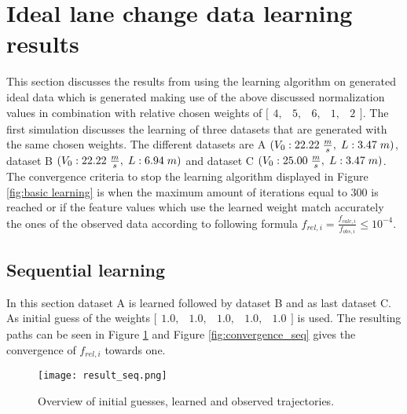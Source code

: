 \section{Ideal lane change data learning results}
This section discusses the results from using the learning algorithm on generated ideal data which is generated making use of the above discussed normalization values in combination with relative chosen weights of $ \bigl[ \begin{smallmatrix} 4,&5,&6,&1,&2\end{smallmatrix}\bigr]$. The first simulation discusses the learning of three datasets that are generated with the same chosen weights. The different datasets are A $(V_0:22.22\hspace{1mm}\frac{m}{s},\hspace{1mm} L:3.47\hspace{1mm}m)$, dataset B $(V_0:22.22\hspace{1mm}\frac{m}{s},\hspace{1mm} L:6.94\hspace{1mm}m)$ and dataset C $(V_0:25.00\hspace{1mm}\frac{m}{s},\hspace{1mm} L:3.47\hspace{1mm}m)$. The convergence criteria to stop the learning algorithm displayed in Figure \ref{fig:basic learning} is when the maximum amount of iterations equal to $300$ is reached or if the feature values which use the learned weight match accurately the ones of the observed data according to following formula $f_{rel,i} = \frac{f_{calc,i}}{f_{obs,i}} \leq 10^{-4}$.

\subsection{Sequential learning}
In this section dataset A is learned followed by dataset B and as last dataset C.
As initial guess of the weights $\bigl[ \begin{smallmatrix} 1.0,&1.0,&1.0,&1.0,&1.0\end{smallmatrix}\bigr]$ is used.  The resulting paths can be seen in Figure \ref{fig:result_seq} and Figure \ref{fig:convergence_seq} gives the convergence of $f_{rel,i}$ towards one.\\

\begin{figure}[h!]
	\centering
	\texttt{[image: result\_seq.png]}
	\caption{Overview of initial guesses, learned and observed trajectories.} 
	\label{fig:result_seq}
\end{figure}

